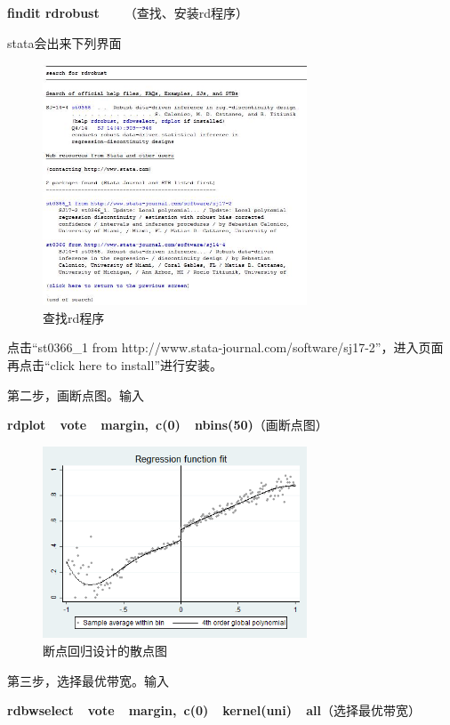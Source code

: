 \documentclass[cn,12pt,math=newtx,citestyle=gb7714-2015,bibstyle=gb7714-2015]{elegantbook}
\begin{document}
	\textbf{findit rdrobust}~~~~（查找、安装rd程序）
	
	stata会出来下列界面
	
	\begin{figure}[htbp]
		\centering
		\includegraphics[width=0.7\textwidth]{findit.jpg}
		\caption{查找rd程序}\label{fig:digit}
	\end{figure}
	
	点击“st0366\_1 from http://www.stata-journal.com/software/sj17-2”，进入页面再点击“click here to install”进行安装。
	
	第二步，画断点图。输入
	
	\textbf{rdplot~~vote~~margin,~c(0)~~nbins(50)}（画断点图）
	
	\begin{figure}[htbp]
		\centering
		\includegraphics[width=0.7\textwidth]{rdgraph.png}
		\caption{断点回归设计的散点图}\label{fig:digit}
	\end{figure}
	
	第三步，选择最优带宽。输入
	
	\textbf{rdbwselect~~vote~~margin,~c(0)~~kernel(uni)~~all}（选择最优带宽）
	
\end{document}
